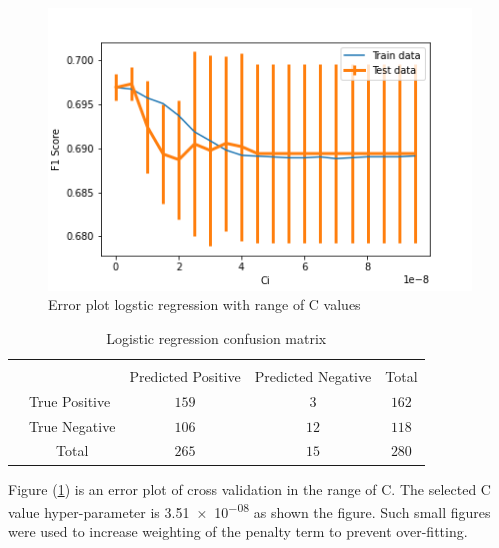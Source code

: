 \documentclass[transmag]{IEEEtran}
\begin{document}
\begin{figure}[h]
	\includegraphics[width=\columnwidth]{logistic_cv_ci.png} 
    \caption{Error plot logstic regression with range of C values}%
    \label{fig:logistic_c}%
\end{figure}

\begin{table}[h]
\begin{center}
\begin{tabular}{l|l|c|c|c}
\multicolumn{2}{c}{}&\multicolumn{2}{c}{}&\\
\cline{3-4}
\multicolumn{2}{c|}{}& Predicted Positive & Predicted Negative &\multicolumn{1}{c}{Total}\\
\cline{2-4}
\multirow{2}{*}{}& True Positive & $159$ & $3$ & $162$\\
\cline{2-4}
& True Negative & $106$ & $12$ & $118$\\
\cline{2-4}
\multicolumn{1}{c}{} & \multicolumn{1}{c}{Total} & \multicolumn{1}{c}{$265$} & \multicolumn{    1}{c}{$15$} & \multicolumn{1}{c}{$280$}\\
\end{tabular}
\end{center}
\caption{Logistic regression confusion matrix} 
\label{table:confusion_logistic}
\end{table}

\noindent Figure (\ref{fig:logistic_c}) is an error plot of cross validation in the range of C. The selected C value hyper-parameter is \num{3.51e-08} as shown the figure. Such small figures were used to increase weighting of the penalty term to prevent over-fitting.
\end{document}
